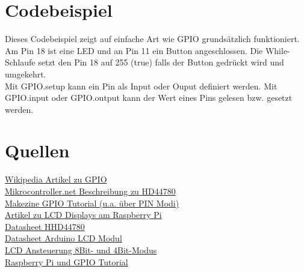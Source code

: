 \documentclass[a4paper,11pt]{article}
\begin{document}
\section*{Codebeispiel}
Dieses Codebeispiel zeigt auf einfache Art wie GPIO grundsätzlich funktioniert. Am Pin 18 ist eine LED und an Pin 11 ein Button angeschlossen.
Die While-Schlaufe setzt den Pin 18 auf 255 (true) falls der Button gedrückt wird und umgekehrt.\\


Mit GPIO.setup kann ein Pin als Input oder Ouput definiert werden. Mit GPIO.input oder GPIO.output kann der Wert eines Pins gelesen bzw. gesetzt werden.


\section*{Quellen}
\href{https://en.wikipedia.org/wiki/General-purpose_input/output}{Wikipedia Artikel zu GPIO}\\
\href{http://www.mikrocontroller.net/articles/HD44780}{Mikrocontroller.net Beschreibung zu HD44780}\\
\href{http://makezine.com/projects/tutorial-raspberry-pi-gpio-pins-and-python/}{Makezine GPIO Tutorial (u.a. über PIN Modi)}\\
\href{https://projects.drogon.net/raspberry-pi/gpio-examples/lcd-interface/}{Artikel zu LCD Displays am Raspberry Pi}\\
\href{https://www.sparkfun.com/datasheets/LCD/HD44780.pdf}{Datasheet HHD44780}\\
\href{http://www.protostack.com/download/YJD1602A-1\%20datasheet.pdf}{Datasheet Arduino LCD Modul}\\
\href{http://www.protostack.com/blog/2010/03/character-lcd-displays-part-1/}{LCD Ansteuerung 8Bit- und 4Bit-Modus}\\
\href{http://openmicros.org/index.php/articles/94-ciseco-product-documentation/raspberry-pi/217-getting-started-with-raspberry-pi-gpio-and-python}{Raspberry Pi und GPIO Tutorial}
\end{document}
